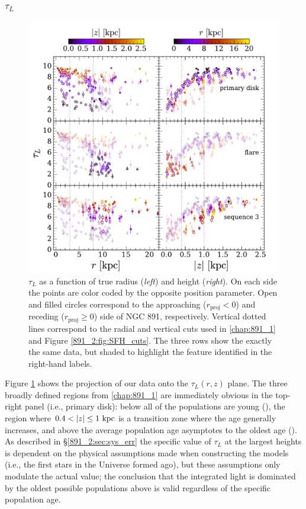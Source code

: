 \subsubsection{{\Large $\tau_L$}}
\begin{figure}
  \centering
  \includegraphics[width=\textwidth]{891_2/figs/MLWA_rz_all.pdf}
  \caption[$\tau_L$ vs
    ($r,|z|$)]{\fixspacing\label{891_2:fig:MLWA_rz}$\tau_L$ as a
    function of true radius (\emph{left}) and height
    (\emph{right}). On each side the points are color coded by the
    opposite position parameter. Open and filled circles correspond to
    the approaching ($r_\mathrm{proj} < 0$) and receding
    ($r_\mathrm{proj}\geq 0$) side of NGC 891, respectively. Vertical
    dotted lines correspond to the radial and vertical cuts used in
    \ref{chap:891_1} and Figure \ref{891_2:fig:SFH_cuts}. The three
    rows show the exactly the same data, but shaded to highlight the
    feature identified in the right-hand labels.}
\end{figure}

Figure \ref{891_2:fig:MLWA_rz} shows the projection of our data onto the
$\tau_L(r,z)$ plane. The three broadly defined regions from
\ref{chap:891_1} are immediately obvious in the top-right
panel (i.e., primary disk): below  all of the
populations are young (), the region where $0.4 < |z|
\leq 1~\mathrm{kpc} $ is a transition zone where the age generally
increases, and above  the average population age
asymptotes to the oldest age (). As described in
\S\ref{891_2:sec:sys_err} the specific value of $\tau_L$ at the largest
heights is dependent on the physical assumptions made when
constructing the models (i.e., the first stars in the Universe formed
 ago), but these assumptions only modulate the
actual value; the conclusion that the integrated light is dominated by
the oldest possible populations above  is valid regardless
of the specific population age.

